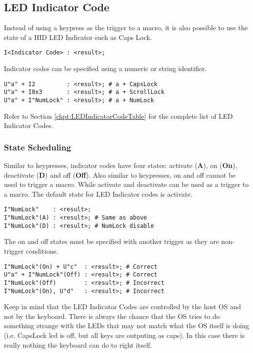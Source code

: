 \documentclass{kiibohd-template}
\begin{document}
\subsection{LED Indicator Code}
\label{subsec:LED_Indicator_Code}

Instead of using a keypress as the trigger to a macro, it is also possible to use the state of a HID LED Indicator such as Caps Lock.

\begin{lstlisting}
I<Indicator Code> : <result>;
\end{lstlisting}

Indicator codes can be specified using a numeric or string identifier.

\begin{lstlisting}
U"a" + I2         : <result>; # a + CapsLock
U"a" + I0x3       : <result>; # a + ScrollLock
U"a" + I"NumLock" : <result>; # a + NumLock
\end{lstlisting}

Refer to Section \ref{chpt:LEDIndicatorCodeTable} for the complete list of LED Indicator Codes.


\subsubsection{State Scheduling}

Similar to keypresses, indicator codes have four states: activate (\textbf{A}), on (\textbf{On}), deactivate (\textbf{D}) and off (\textbf{Off}).
Also similar to keypresses, on and off cannot be used to trigger a macro.
While activate and deactivate can be used as a trigger to a macro.
The default state for LED Indicator codes is activate.

\begin{lstlisting}
I"NumLock"    : <result>;
I"NumLock"(A) : <result>; # Same as above
I"NumLock"(D) : <result>; # NumLock disable
\end{lstlisting}

The on and off states must be specified with another trigger as they are non-trigger conditions.

\begin{lstlisting}
I"NumLock"(On) + U"c"  : <result>; # Correct
U"a" + I"NumLock"(Off) : <result>; # Correct
I"NumLock"(Off)        : <result>; # Incorrect
I"NumLock"(On), U"d"   : <result>; # Incorrect
\end{lstlisting}

Keep in mind that the LED Indicator Codes are controlled by the host OS and not by the keyboard.
There is always the chance that the OS tries to do something strange with the LEDs that may not match what the OS itself is doing (i.e. CapsLock led is off, but all keys are outputing as caps).
In this case there is really nothing the keyboard can do to right itself.
\end{document}
